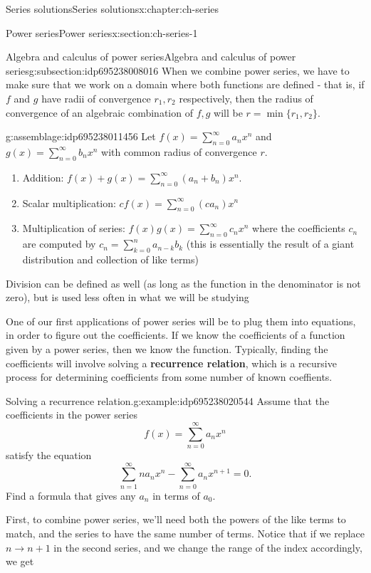 \documentclass[oneside,10pt,]{book}
\newcommand{\terminology}[1]{\textbf{#1}}
\numberwithin{equation}{section}
\numberwithin{equation}{section}
\newcommand{\ps}{\displaystyle \sum_{n=0}^\infty a_n x^n}
\newcommand{\psg}{\displaystyle \sum_{n=0}^\infty b_n x^n}
\begin{document}
\begin{chapterptx}{Series solutions}{}{Series solutions}{}{}{x:chapter:ch-series}
\begin{sectionptx}{Power series}{}{Power series}{}{}{x:section:ch-series-1}
\begin{subsectionptx}{Algebra and calculus of power series}{}{Algebra and calculus of power series}{}{}{g:subsection:idp695238008016}
When we combine power series, we have to make sure that we work on a domain where both functions are defined - that is, if \(f\) and \(g\) have radii of convergence \(r_1, r_2\) respectively, then the radius of convergence of an algebraic combination of \(f,g\) will be \(r = \min\{r_1,r_2\}\).%
\begin{assemblage}{}{g:assemblage:idp695238011456}%
Let \(f(x) = \ps\) and \(g(x) =\psg\) with common radius of convergence \(r\).%
\begin{enumerate}
\item{}Addition: \(f(x) +g(x)  = \displaystyle\sum_{n=0}^\infty (a_n + b_n) x^n\).%
\item{}Scalar multiplication: \(c f(x) = \displaystyle\sum_{n=0}^\infty (ca_n) x^n\)%
\item{}Multiplication of series: \(f(x) g(x) = \displaystyle\sum_{n=0}^\infty c_n x^n\) where the coefficients \(c_n\) are computed by \(c_n = \displaystyle \sum_{k=0}^n a_{n-k} b_k\) (this is essentially the result of a giant distribution and collection of like terms)%
\end{enumerate}
Division can be defined as well (as long as the function in the denominator is not zero), but is used less often in what we will be studying%
\end{assemblage}
One of our first applications of power series will be to plug them into equations, in order to figure out the coefficients. If we know the coefficients of a function given by a power series, then we know the function. Typically, finding the coefficients will involve solving a \terminology{recurrence relation}, which is a recursive process for determining coefficients from some number of known coeffients.%
\begin{example}{Solving a recurrence relation.}{g:example:idp695238020544}%
Assume that the coefficients in the power series%
\begin{equation*}
f(x) = \ps
\end{equation*}
satisfy the equation%
\begin{equation*}
\sum_{n=1}^\infty n a_n x^n - \sum_{n=0}^\infty a_n x^{n+1} = 0.
\end{equation*}
Find a formula that gives any \(a_n\) in terms of \(a_0\).%
\par
First, to combine power series, we'll need both the powers of the like terms to match, and the series to have the same number of terms. Notice that if we replace \(n \rightarrow n + 1\) in the second series, and we change the range of the index accordingly, we get%

\end{example}
\end{subsectionptx}
\end{sectionptx}
\end{chapterptx}
\end{document}

